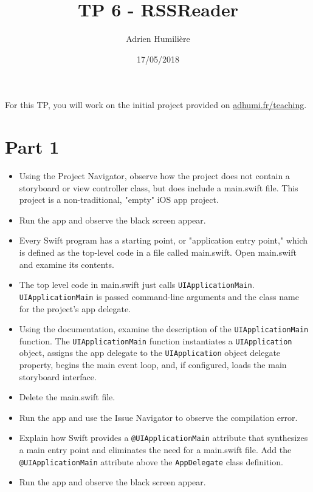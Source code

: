 \documentclass[a4paper,11pt]{scrartcl}
\begin{document}
\newcommand{\mytitle}{TP 6 - RSSReader}
\title{\mytitle}
\author{Adrien Humilière}
\date{17/05/2018}

\maketitle

For this TP, you will work on the initial project provided on \underline{adhumi.fr/teaching}.

\section*{Part 1}

\begin{itemize}
\item Using the Project Navigator, observe how the project does not contain a storyboard or view controller class, but does include a main.swift file. This project is a non-traditional, "empty" iOS app project.
\item Run the app and observe the black screen appear.
\item Every Swift program has a starting point, or "application entry point," which is defined as the top-level code in a file called main.swift. Open main.swift and examine its contents.
\item The top level code in main.swift just calls \texttt{UIApplicationMain}. \texttt{UIApplicationMain} is passed command-line arguments and the class name for the project's app delegate.
\item Using the documentation, examine the description of the \texttt{UIApplicationMain} function. The \texttt{UIApplicationMain} function instantiates a \texttt{UIApplication} object, assigns the app delegate to the \texttt{UIApplication} object delegate property, begins the main event loop, and, if configured, loads the main storyboard interface.
\item Delete the main.swift file.
\item Run the app and use the Issue Navigator to observe the compilation error.
\item Explain how Swift provides a \texttt{@UIApplicationMain} attribute that synthesizes a main entry point and eliminates the need for a main.swift file. Add the \texttt{@UIApplicationMain} attribute above the \texttt{AppDelegate} class definition.
\item Run the app and observe the black screen appear.
\end{itemize}
\end{document}

